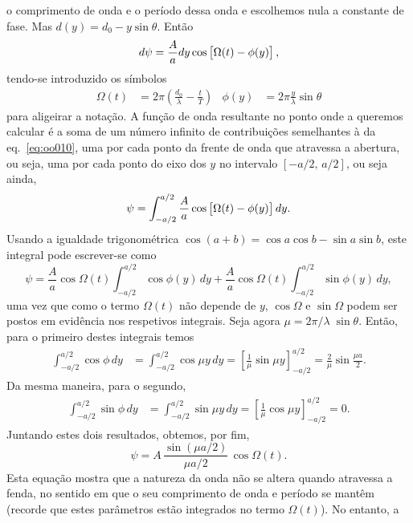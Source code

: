 o comprimento de onda e o período dessa onda e escolhemos nula a constante de
fase.  Mas $d(y)=d_0-y\sin\theta$. Então
\begin{equation}
    d\psi = \frac{A}{a} dy\cos\left[\Omega(t)-\strut\phi(y)\right],\label{eq:oo010}
\end{equation}
tendo-se introduzido os símbolos
\begin{align*}
    \Omega(t)&=2\pi\left(\frac{d_0}{\lambda}-\frac{t}{T}\right)&
    \phi(y)&=2\pi \frac y \lambda \sin\theta
\end{align*}
para aligeirar a notação. A função de onda resultante no ponto onde a queremos
calcular é a soma de um número infinito de contribuições semelhantes à da
eq.~\eqref{eq:oo010}, uma por cada ponto da frente de onda que atravessa a
abertura, ou seja, uma por cada ponto do eixo dos $y$ no intervalo
$[-a/2,\,a/2]$, ou seja ainda,
\begin{equation*}
    \psi=\int_{-a/2}^{a/2}\frac{A}{a}\cos\left[\strut\Omega(t)-\phi(y)\right]dy.
\end{equation*}
Usando a igualdade trigonométrica $\cos(a+b)=\cos a\cos b-\sin a\sin b$, este
integral pode escrever-se como
\begin{equation*}
    \psi=\frac{A}{a}\cos\Omega(t)\int_{-a/2}^{a/2}\cos\phi(y)\,dy+
         \frac{A}{a}\cos\Omega(t)\int_{-a/2}^{a/2}\sin\phi(y)\,dy,
\end{equation*}
uma vez que como o termo $\Omega(t)$ não depende de $y$, $\cos\Omega$ e
$\sin\Omega$ podem ser postos em evidência nos respetivos integrais. Seja agora
$\mu=2\pi/\lambda\;\sin\theta$. Então, para o primeiro destes integrais temos
\begin{align*}
    \int_{-a/2}^{a/2}\cos\phi\,dy&=\int_{-a/2}^{a/2}\cos\mu y\,dy=
    \left[\frac{1}{\mu}\sin\mu y\right]_{-a/2}^{a/2}=
    \frac2{\mu}\sin\frac{\mu a}2.
\end{align*}
Da mesma maneira, para o segundo,
\begin{align*}
    \int_{-a/2}^{a/2}\sin\phi\,dy&=\int_{-a/2}^{a/2}\sin\mu y\,dy=
    \left[\frac{1}{\mu}\cos\mu y\right]_{-a/2}^{a/2}=0.
\end{align*}
Juntando estes dois resultados, obtemos, por fim,
\begin{equation*}
    \psi = A\,\frac{\sin(\mu a/2)}{\mu a/2}\,\cos\Omega(t).
\end{equation*}
Esta equação mostra que a natureza da onda não se altera quando atravessa a
fenda, no sentido em que o seu comprimento de onda e período se mantêm (recorde
que estes parâmetros estão integrados no termo $\Omega(t)$). No entanto, a

